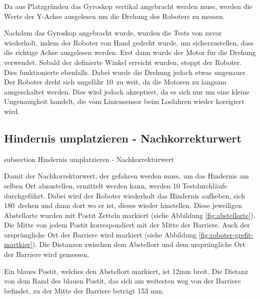 Da aus Platzgründen das Gyroskop vertikal angebracht werden muss, werden die Werte der Y-Achse ausgelesen um die Drehung des Roboters zu messen.

Nachdem das Gyroskop angebracht wurde, wurden die Tests von zuvor wiederholt, indem der Roboter von Hand gedreht wurde, um sicherzustellen, dass die richtige Achse ausgelesen werden. Erst dann wurde der Motor für die Drehung verwendet. Sobald der definierte Winkel erreicht wurden, stoppt der Roboter. Dies funktionierte ebenfalls. Dabei wurde die Drehung jedoch etwas ungenauer. Der Roboter dreht sich ungefähr 10\textdegree \ zu weit, da die Motoren zu langsam ausgeschaltet werden. Dies wird jedoch akzeptiert, da es sich nur um eine kleine Ungenauigkeit handelt, die vom Liniensensor beim Losfahren wieder korrigiert wird.


\newpage
\subsection*{Hindernis umplatzieren - Nachkorrekturwert}\label{hindernis-nachkorrektur}
    {subsection}
    {Hindernis umplatzieren - Nachkorrekturwert}

Damit der Nachkorrekturwert, der gefahren werden muss, um das Hindernis am selben Ort abzustellen, ermittelt werden kann, werden 10 Testdurchläufe durchgeführt. Dabei wird der Roboter wiederholt das Hindernis aufheben, sich 180\textdegree \ drehen und dann dort wo er ist, dieses wieder hinstellen. Diese jeweiligen Abstellorte wurden mit Postit Zetteln markiert (siehe Abbildung \ref{fig:abstellorte}). Die Mitte von jedem Postit korrespondiert mit der Mitte der Barriere. Auch der ursprüngliche Ort der Barriere wird markiert (siehe Abbildung \ref{fig:roboter-grefit-martkier}). Die Distanzen zwischen dem Abstellort und dem ursprüngliche Ort der Barriere wird gemessen. 

Ein blaues Postit, welches den Abstellort markiert, ist 12mm breit. Die Distanz von dem Rand des blauen Postit, das sich am weitesten weg von der Barriere befindet, zu der Mitte der Barriere beträgt 153 mm.

